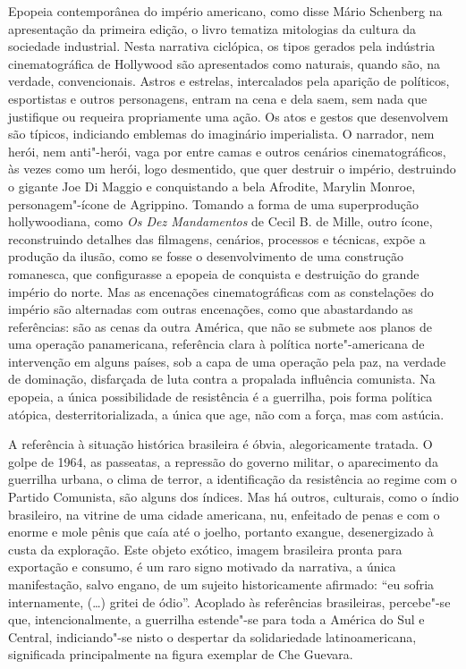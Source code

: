 Epopeia contemporânea do império americano, como disse Mário Schenberg
na apresentação da primeira edição, o livro tematiza mitologias da
cultura da sociedade industrial. Nesta narrativa ciclópica, os tipos
gerados pela indústria cinematográfica de Hollywood são apresentados
como naturais, quando são, na verdade, convencionais. Astros e estrelas,
intercalados pela aparição de políticos, esportistas e outros
personagens, entram na cena e dela saem, sem nada que justifique ou
requeira propriamente uma ação. Os atos e gestos que desenvolvem são
típicos, indiciando emblemas do imaginário imperialista. O narrador, nem
herói, nem anti"-herói, vaga por entre camas e outros cenários
cinematográficos, às vezes como um herói, logo desmentido, que quer
destruir o império, destruindo o gigante Joe Di Maggio e conquistando a
bela Afrodite, Marylin Monroe, personagem"-ícone de Agrippino. Tomando a
forma de uma superprodução hollywoodiana, como \emph{Os Dez Mandamentos}
de Cecil B. de Mille, outro ícone, reconstruindo detalhes das filmagens,
cenários, processos e técnicas, expõe a produção da ilusão, como se
fosse o desenvolvimento de uma construção romanesca, que configurasse a
epopeia de conquista e destruição do grande império do norte. Mas as
encenações cinematográficas com as constelações do império são
alternadas com outras encenações, como que abastardando as referências:
são as cenas da outra América, que não se submete aos planos de uma
operação panamericana, referência clara à política norte"-americana de
intervenção em alguns países, sob a capa de uma operação pela paz, na
verdade de dominação, disfarçada de luta contra a propalada influência
comunista. Na epopeia, a única possibilidade de resistência é a
guerrilha, pois forma política atópica, desterritorializada, a única que
age, não com a força, mas com astúcia.

A referência à situação histórica brasileira é óbvia, alegoricamente
tratada. O golpe de 1964, as passeatas, a repressão do governo militar,
o aparecimento da guerrilha urbana, o clima de terror, a identificação
da resistência ao regime com o Partido Comunista, são alguns dos
índices. Mas há outros, culturais, como o índio brasileiro, na vitrine
de uma cidade americana, nu, enfeitado de penas e com o enorme e mole
pênis que caía até o joelho, portanto exangue, desenergizado à custa da
exploração. Este objeto exótico, imagem brasileira pronta para
exportação e consumo, é um raro signo motivado da narrativa, a única
manifestação, salvo engano, de um sujeito historicamente afirmado: ``eu
sofria internamente, (\ldots{}) gritei de ódio''. Acoplado às referências
brasileiras, percebe"-se que, intencionalmente, a guerrilha estende"-se
para toda a América do Sul e Central, indiciando"-se nisto o despertar da
solidariedade latinoamericana, significada principalmente na figura
exemplar de Che Guevara.

